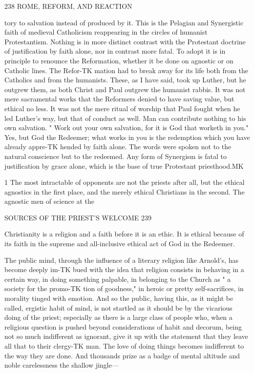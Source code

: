 \documentclass[12pt,a5paper,twoside]{book}
\begin{document}
{238 ROME, REFORM, AND REACTION 

tory to salvation instead of produced by it. This 
is the Pelagian and Synergistic faith of medieval 
Catholicism reappearing in the circles of humanist 
Protestantism. Nothing is in more distinct contrast 
with the Protestant doctrine of justification by faith 
alone, nor in contrast more fatal. To adopt it is in 
principle to renounce the Reformation, whether it be 
done on agnostic or on Catholic lines. The Refor-TK
mation had to break away for its life both from the 
Catholics and from the humanists. These, as I have 
said, took up Luther, but he outgrew them, as both 
Christ and Paul outgrew the humanist rabbis. It was 
not mere sacramental works that the Reformers denied 
to have saving value, but ethical no less. It was not 
the mere ritual of worship that Paul fought when he 
led Luther's way, but that of conduct as well. Man 
can contribute nothing to his own salvation. " Work 
out your own salvation, for it is God that worketh in 
you." Yes, but God the Redeemer; what works in 
you is the redemption which you have already appre-TK
hended by faith alone. The words were spoken not to 
the natural conscience but to the redeemed. Any form 
of Synergism is fatal to justification by grace alone, 
which is the base of true Protestant priesthood.MK 

1 The most intractable of opponents are not the priests after all, 
but the ethical agnostics in the first place, and the merely ethical 
Christians in the second. The agnostic men of science at the 



SOURCES OF THE PRIEST'S WELCOME 239 

Christianity is a religion and a faith before it is an 
ethic. It is ethical because of its faith in the supreme 
and all-inclusive ethical act of God in the Redeemer. 

The public mind, through the influence of a 
literary religion like Arnold's, has become deeply im-TK
bued with the idea that religion consists in behaving 
in a certain way, in doing something palpable, in 
belonging to the Church as " a society for the promo-TK
tion of goodness," in heroic or pretty self-sacrifices, in 
morality tinged with emotion. And so the public, 
having this, as it might be called, ergistic habit of 
mind, is not startled as it should be by the vicarious 
doing of the priest; especially as there is a large class 
of people who, when a religious question is pushed 
beyond considerations of habit and decorum, being 
not so much indifferent as ignorant, give it up with 
the statement that they leave all that to their clergy-TK
man. The love of doing things becomes indifferent 
to the way they are done. And thousands prize as a 
badge of mental altitude and noble carelessness the 
shallow jingle---

}
\end{document}
